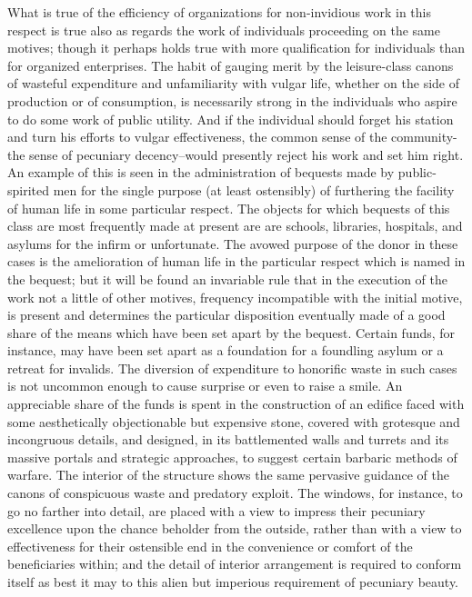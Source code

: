 \documentclass[12pt]{report}
\begin{document}
What is true of the efficiency of organizations for non-invidious
work in this respect is true also as regards the work of individuals
proceeding on the same motives; though it perhaps holds true with more
qualification for individuals than for organized enterprises. The habit
of gauging merit by the leisure-class canons of wasteful expenditure and
unfamiliarity with vulgar life, whether on the side of production or of
consumption, is necessarily strong in the individuals who aspire to do
some work of public utility. And if the individual should forget his
station and turn his efforts to vulgar effectiveness, the common sense
of the community-the sense of pecuniary decency--would presently
reject his work and set him right. An example of this is seen in the
administration of bequests made by public-spirited men for the single
purpose (at least ostensibly) of furthering the facility of human life
in some particular respect. The objects for which bequests of this class
are most frequently made at present are
are schools, libraries, hospitals, and asylums for the infirm or
unfortunate. The avowed purpose of the donor in these cases is the
amelioration of human life in the particular respect which is named
in the bequest; but it will be found an invariable rule that in
the execution of the work not a little of other motives, frequency
incompatible with the initial motive, is present and determines the
particular disposition eventually made of a good share of the means
which have been set apart by the bequest. Certain funds, for instance,
may have been set apart as a foundation for a foundling asylum or a
retreat for invalids. The diversion of expenditure to honorific waste in
such cases is not uncommon enough to cause surprise or even to raise a
smile. An appreciable share of the funds is spent in the construction
of an edifice faced with some aesthetically objectionable but expensive
stone, covered with grotesque and incongruous details, and designed, in
its battlemented walls and turrets and its massive portals and strategic
approaches, to suggest certain barbaric methods of warfare. The interior
of the structure shows the same pervasive guidance of the canons of
conspicuous waste and predatory exploit. The windows, for instance,
to go no farther into detail, are placed with a view to impress their
pecuniary excellence upon the chance beholder from the outside, rather
than with a view to effectiveness for their ostensible end in the
convenience or comfort of the beneficiaries within; and the detail of
interior arrangement is required to conform itself as best it may to
this alien but imperious requirement of pecuniary beauty.
\end{document}
